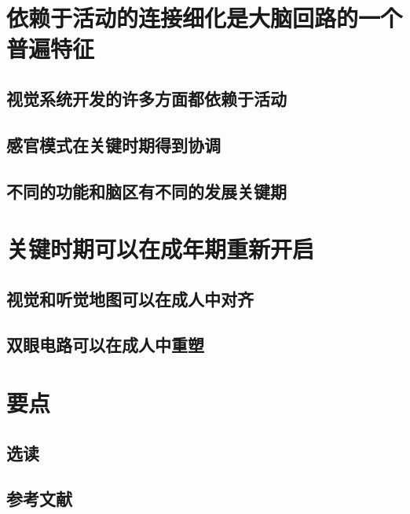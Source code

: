 \section{依赖于活动的连接细化是大脑回路的一个普遍特征}
\subsection{视觉系统开发的许多方面都依赖于活动}
\subsection{感官模式在关键时期得到协调}
\subsection{不同的功能和脑区有不同的发展关键期}

\section{关键时期可以在成年期重新开启}
\subsection{视觉和听觉地图可以在成人中对齐}
\subsection{双眼电路可以在成人中重塑}

\section{要点}
\subsection{选读}
\subsection{参考文献}
